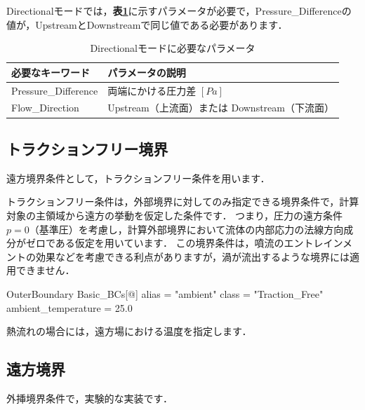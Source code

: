 Directionalモードでは，\textbf{表\ref{tbl:parameter dir. mode}}に示すパラメータが必要で，Pressure\_Differenceの値が，UpstreamとDownstreamで同じ値である必要があります．

\begin{table}[htdp]
\caption{Directionalモードに必要なパラメータ}
\begin{center}
\small
\begin{tabular}{ll} \toprule
必要なキーワード & パラメータの説明\\ \midrule
Pressure\_Difference & 両端にかける圧力差 $[Pa]$\\
Flow\_Direction & Upstream（上流面）または Downstream（下流面）\\
\bottomrule
\end{tabular}
\end{center}
\label{tbl:parameter dir. mode}
\end{table}



\pagebreak
\subsection{トラクションフリー境界}

遠方境界条件として，トラクションフリー条件を用います．

\vspace{2mm}

トラクションフリー条件は，外部境界に対してのみ指定できる境界条件で，計算対象の主領域から遠方の挙動を仮定した条件です．
つまり，圧力の遠方条件$p=0$（基準圧）を考慮し，計算外部境界において流体の内部応力の法線方向成分がゼロである仮定を用いています．
この境界条件は，噴流のエントレインメントの効果などを考慮できる利点がありますが，渦が流出するような境界には適用できません．

{\small
\begin{program}
OuterBoundary {
  Basic_BCs[@] {
    alias    = "ambient"
    class    = "Traction_Free"
    ambient_temperature = 25.0
  }
}
\end{program}
}

熱流れの場合には，遠方場における温度を指定します．



\pagebreak
\subsection{遠方境界}

外挿境界条件で，実験的な実装です．


